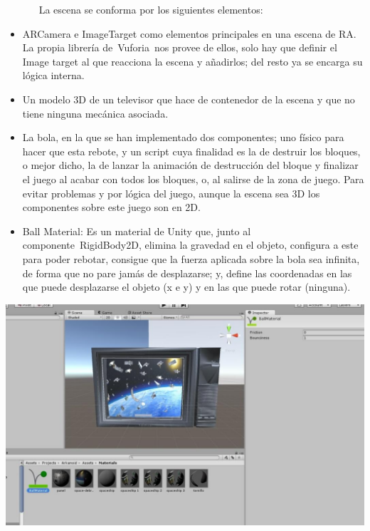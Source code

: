 \documentclass[]{article}
\begin{document}
~ ~ ~ ~ La escena se conforma por los siguientes elementos:

\begin{itemize}
\itemsep1pt\parskip0pt
\item
  ARCamera e ImageTarget como elementos principales en una escena de RA.
  La propia librería de~Vuforia~nos provee de ellos, solo hay que
  definir el Image target al que reacciona la escena y añadirlos; del
  resto ya se encarga su lógica interna.
\item
  Un modelo 3D de un televisor que hace de contenedor de la escena y que
  no tiene ninguna mecánica asociada.
\item
  La bola, en la que se han implementado dos componentes; uno físico
  para hacer que esta rebote, y un script cuya finalidad es la de
  destruir los bloques, o mejor dicho, la de lanzar la animación de
  destrucción del bloque y finalizar el juego al acabar con todos los
  bloques, o, al salirse de la zona de juego. Para evitar problemas y
  por lógica del juego, aunque la escena sea 3D los componentes sobre
  este juego son en 2D.
\end{itemize}

\begin{itemize}
\itemsep1pt\parskip0pt
\item
  Ball Material: Es un material de Unity que, junto al
  componente~RigidBody2D, elimina la gravedad en el objeto, configura a
  este para poder rebotar, consigue que la fuerza aplicada sobre la bola
  sea infinita, de forma que no pare jamás de desplazarse; y, define las
  coordenadas en las que puede desplazarse el objeto (x e y) y en las
  que puede rotar (ninguna).
\end{itemize}

\includegraphics{images/image17.jpg}
\end{document}
